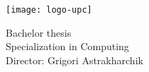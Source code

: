 
\thispagestyle{empty}
\clearpage
\setcounter{page}{-1}

\makeatletter
\begin{titlepage}
{
    \centering
    \texttt{[image: logo-upc]}
    \null
    \vspace{3em}
    {\Huge \bfseries \@title \par}
    \vspace{2em}
    \vspace{3em}
    {\large \scshape \@date \par}

    \vfill
    {\raggedleft \large \bfseries \@author \par}
    \vspace{1em}
    {\raggedleft \large
        Bachelor thesis \\
        Specialization in Computing \\
        \vspace{2em}
        Director: Grigori Astrakharchik \\
    \par}
}
\end{titlepage}
\makeatother
